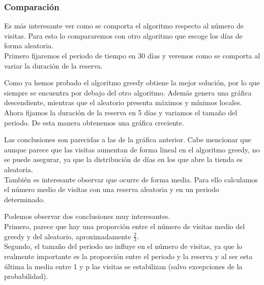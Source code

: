 \begin{center}
\resizebox{6in}{!}{}
\end{center}

\subsubsection{Comparación}

Es más interesante ver como se comporta el algoritmo respecto al número de visitas. Para esto lo compararemos con otro algoritmo que escoge los días de forma aleatoria.\\

Primero fijaremos el periodo de tiempo en 30 días y veremos como se comporta al variar la duración de la reserva.\\

\begin{center}
\resizebox{5.3in}{!}{}
\end{center}

Como ya hemos probado el algoritmo greedy obtiene la mejor solución, por lo que siempre se encuentra por debajo del otro algoritmo. Además genera una gráfica descendiente, mientras que el aleatorio presenta máximos y mínimos locales.\\

Ahora fijamos la duración de la reserva en 5 días y variamos el tamaño del periodo. De esta manera obtenemos una gráfica creciente.\\

\begin{center}
\resizebox{5.3in}{!}{}
\end{center}

Las conclusiones son parecidas a las de la gráfica anterior. Cabe mencionar que aunque parece que las visitas aumentan de forma lineal en el algoritmo greedy, no se puede asegurar, ya que la distribución de días en los que abre la tienda es aleatoria.\\

También es interesante observar que ocurre de forma media. Para ello calculamos el número medio de visitas con una reserva aleatoria y en un periodo determinado.\\

\begin{center}
\resizebox{5.3in}{!}{}
\end{center}

Podemos observar dos conclusiones muy interesantes.\\

Primero, parece que hay una proporción entre el número de visitas medio del greedy y del aleatorio, aproximadamente $\frac{2}{3}$.\\

Segundo, el tamaño del periodo no influye en el número de visitas, ya que lo realmente importante es la proporción entre el periodo y la reserva y al ser esta última la media entre 1 y p las visitas se estabilizan (salvo excepciones de la probabilidad).